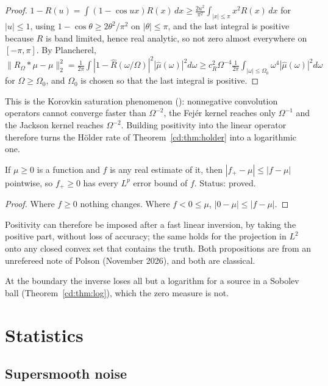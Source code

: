 \begin{proof}
$1-\widehat R(u)=\int(1-\cos ux)R(x)\,dx\ge\frac{2u^2}{\pi^2}\int_{|x|\le\pi}x^2R(x)\,dx$ for $|u|\le1$, using $1-\cos\theta\ge2\theta^2/\pi^2$ on $|\theta|\le\pi$, and the last integral is positive because $R$ is band limited, hence real analytic, so not zero almost everywhere on $[-\pi,\pi]$. By Plancherel, $\|R_\Omega*\mu-\mu\|_2^2=\frac1{2\pi}\int|1-\widehat R(\omega/\Omega)|^2|\widehat\mu(\omega)|^2d\omega\ge c_R^2\Omega^{-4}\frac1{2\pi}\int_{|\omega|\le\Omega_0}\omega^4|\widehat\mu(\omega)|^2d\omega$ for $\Omega\ge\Omega_0$, and $\Omega_0$ is chosen so that the last integral is positive.
\end{proof}

This is the Korovkin saturation phenomenon (\cite[Chapter~9]{DeVoreLorentz93}): nonnegative convolution operators cannot converge faster than $\Omega^{-2}$, the Fej\'er kernel reaches only $\Omega^{-1}$ and the Jackson kernel reaches $\Omega^{-2}$. Building positivity into the linear operator therefore turns the H\"older rate of Theorem~\ref{cd:thm:holder} into a logarithmic one.

\begin{proposition}\label{cd:prop:pospart}
If $\mu\ge0$ is a function and $f$ is any real estimate of it, then $|f_+-\mu|\le|f-\mu|$ pointwise, so $f_+\ge0$ has every $L^p$ error bound of $f$. Status: proved.
\end{proposition}

\begin{proof}
Where $f\ge0$ nothing changes. Where $f<0\le\mu$, $|0-\mu|\le|f-\mu|$.
\end{proof}

Positivity can therefore be imposed after a fast linear inversion, by taking the positive part, without loss of accuracy; the same holds for the projection in $L^2$ onto any closed convex set that contains the truth. Both propositions are from an unrefereed note of Polson (November 2026), and both are classical.

At the boundary the inverse loses all but a logarithm for a source in a Sobolev ball (Theorem~\ref{cd:thm:log}), which the zero measure is not.

\section{Statistics}\label{cd:sec:statistics}

\subsection{Supersmooth noise}

